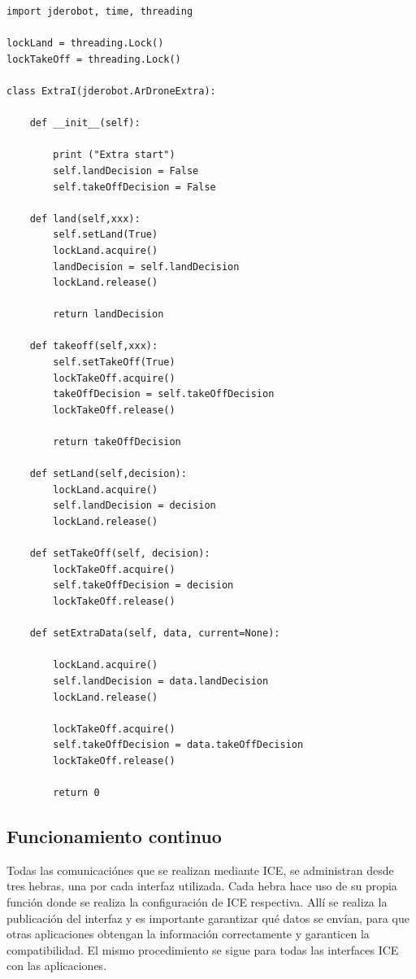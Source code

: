 \begin{lstlisting}[frame=single]
import jderobot, time, threading

lockLand = threading.Lock()
lockTakeOff = threading.Lock()

class ExtraI(jderobot.ArDroneExtra):

    def __init__(self):

        print ("Extra start")
        self.landDecision = False
        self.takeOffDecision = False

    def land(self,xxx):
        self.setLand(True)
        lockLand.acquire()
        landDecision = self.landDecision
        lockLand.release()

        return landDecision

    def takeoff(self,xxx):
        self.setTakeOff(True)
        lockTakeOff.acquire()
        takeOffDecision = self.takeOffDecision
        lockTakeOff.release()

        return takeOffDecision

    def setLand(self,decision):
        lockLand.acquire()
        self.landDecision = decision
        lockLand.release()

    def setTakeOff(self, decision):
        lockTakeOff.acquire()
        self.takeOffDecision = decision
        lockTakeOff.release()

    def setExtraData(self, data, current=None):

        lockLand.acquire()
        self.landDecision = data.landDecision
        lockLand.release()

        lockTakeOff.acquire()
        self.takeOffDecision = data.takeOffDecision
        lockTakeOff.release()

        return 0

\end{lstlisting}  

\subsection{Funcionamiento continuo}

Todas las comunicaciónes que se realizan mediante ICE, se administran desde tres hebras, una por cada interfaz utilizada. Cada hebra hace uso de su propia función donde se realiza la configuración de ICE respectiva. Allí se realiza la publicación del interfaz y es importante garantizar qué datos se envían, para que otras aplicaciones obtengan la información correctamente y garanticen la compatibilidad. El mismo procedimiento se sigue para todas las interfaces ICE con las aplicaciones.

